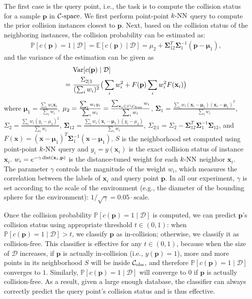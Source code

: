 The first case is the query point, i.e., the task is to compute the collision status for a sample $\mathbf p$ in $\mathcal C\text{-space}$. We first perform point-point $k\text{-NN}$ query to compute the prior collision instances closest to $\mathbf p$. Next, based on the collision status of the neighboring instances, the collision probability can be estimated as:
\begin{align}
  \label{eq:3:knnclassifier}
  \mathbb P[c(\mathbf p) = 1 \mid \mathcal D] = \mathbb E[c(\mathbf p) \mid \mathcal D] = \mu_2 + \boldsymbol \Sigma_{12}^T  \boldsymbol\Sigma_1^{-1} (\mathbf p - \boldsymbol \mu_1),
\end{align}
and the variance of the estimation can be given as
\begin{align}
\label{eq:3:knnclassifiervar}
& \ \textrm{Var}[c(\mathbf p) \mid \mathcal D] \\ \notag
=& \ \frac{\Sigma_{2|1}}{(\sum_i w_i)^2} \big( \sum_i w_i^2 + F(\mathbf p) \sum_i w_i^2 F(\mathbf x_i) \big)
\end{align}
where $\boldsymbol \mu_1 = \frac{\sum_i w_i \mathbf x_i}{\sum_i w_i}$, $\mu_2 = \frac{\sum_i w_i y_i}{\sum_i w_i} = \frac{\sum_{\mathbf x_i \in S \setminus \mathcal C_{\text{free}}}w_i}{\sum_i w_i}$, $\boldsymbol \Sigma_1 = \frac{\sum_i w_i (\mathbf x_i - \boldsymbol \mu_1)(\mathbf x_i - \boldsymbol \mu_1)^T}{\sum_i w_i}$, $\Sigma_2 = \frac{\sum_i w_i (y_i - \mu_2)^2}{\sum_i w_i}$, $\boldsymbol \Sigma_{12} = \frac{\sum_i w_i (\mathbf x_i - \boldsymbol \mu_1)(y_i - \mu_2)}{\sum_i w_i}$, $\Sigma_{2|1} = \Sigma_2 - \boldsymbol \Sigma_{12}^T \boldsymbol \Sigma_1^{-1} \boldsymbol \Sigma_{12}$, and $F(\mathbf x) = (\mathbf x - \boldsymbol \mu_1)^T \boldsymbol \Sigma_1^{-1} (\mathbf x - \boldsymbol \mu_1)$.
$S$ is the neighborhood set computed using point-point $k\text{-NN}$ query and $y_i = y(\mathbf x_i)$ is the exact collision status of instance $\mathbf x_i$. $w_i = e^{-\gamma \operatorname{dist}(\mathbf x_i, \mathbf p)}$ is the distance-tuned weight for each $k\text{-NN}$ neighbor $\mathbf x_i$. The parameter $\gamma$ controls the magnitude of the weight $w_i$, which measures the
correlation between the labels of $\mathbf x_i$ and query point $\mathbf p$. In all our experiment, $\gamma$ is set according to the scale of the environment (e.g., the diameter of the bounding sphere for the environment): $1/\sqrt{\gamma} = 0.05 \cdot \text{scale}$.

Once the collision probability $\mathbb P[c(\mathbf p) = 1 \mid \mathcal D]$ is computed, we can predict $\mathbf p$'s collision status using appropriate threshold $t \in (0, 1)$: when $\mathbb P[c(\mathbf p) = 1 \mid \mathcal D] > t$, we classify $\mathbf p$ as in-collision; otherwise, we classify it as collision-free. This classifier is effective for any $t \in (0, 1)$, because when the size of $\mathcal D$ increases, if $\mathbf p$ is actually in-collision (i.e., $y(\mathbf p) = 1$), more and more points in its neighborhood $S$ will be inside $\mathcal C_{\text{obs}}$, and therefore $\mathbb P[c(\mathbf p) = 1 \mid \mathcal D]$ converges to $1$. Similarly, $\mathbb P[c(\mathbf p) = 1 \mid \mathcal D]$ will converge to $0$ if $\mathbf p$ is actually collision-free. As a result, given a large enough database, the classifier can always correctly predict the query point's collision status and is thus effective.

